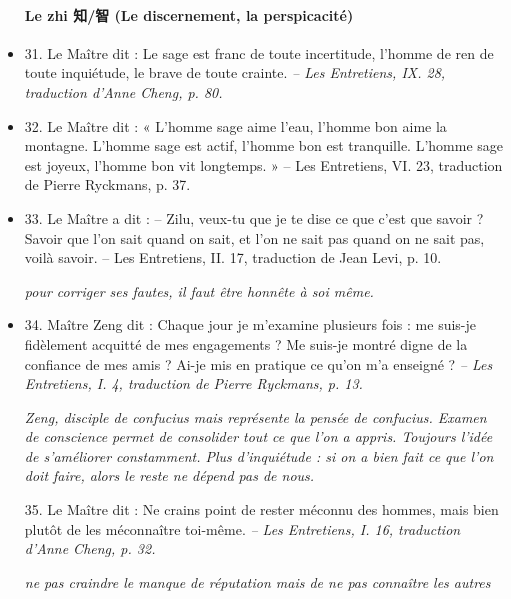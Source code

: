 \begin{itemize}
\paragraph{Le zhi 知/智 (Le discernement, la perspicacité)  }
\item 31. \newline Le Maître dit : Le sage est franc de toute incertitude, l’homme de ren de toute inquiétude, le brave de toute crainte.  \textit{\small -- Les Entretiens, IX. 28, traduction d’Anne Cheng, p. 80.  }
\item 32. \newline Le Maître dit : « L’homme sage aime l’eau, l’homme bon aime la montagne. L’homme sage est actif, l’homme bon est tranquille. L’homme sage est joyeux, l’homme bon vit longtemps. » -- Les Entretiens, VI. 23, traduction de Pierre Ryckmans, p. 37.  
\item 33. \newline Le Maître a dit : -- Zilu, veux-tu que je te dise ce que c’est que savoir ? Savoir que l’on sait quand on sait, et l’on ne sait pas quand on ne sait pas, voilà savoir.  -- Les Entretiens, II. 17, traduction de Jean Levi, p. 10.  

\textit{pour corriger ses fautes, il faut être honnête à soi même.}
\item 34. Maître Zeng dit : Chaque jour je m’examine plusieurs fois : me suis-je fidèlement acquitté de mes engagements ? Me suis-je montré digne de la confiance de mes amis ? Ai-je mis en pratique ce qu’on m’a enseigné ? \textit{\small -- Les Entretiens, I. 4, traduction de Pierre Ryckmans, p. 13.  }

\textit{Zeng, disciple de confucius mais représente la pensée de confucius. Examen de conscience permet de consolider tout ce que l'on a appris. Toujours l'idée de s'améliorer constamment. Plus d'inquiétude : si on a bien fait ce que l'on doit faire, alors le reste ne dépend pas de nous. }

35. \newline Le Maître dit : Ne crains point de rester méconnu des hommes, mais bien plutôt de les méconnaître toi-même. \textit{\small -- Les Entretiens, I. 16, traduction d’Anne Cheng, p. 32.  }

\textit{ne pas craindre le manque de réputation mais de ne pas connaître les autres}



\end{itemize}
